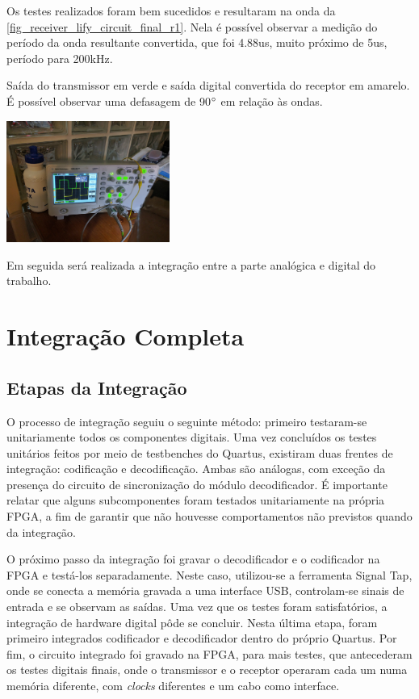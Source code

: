 	Os testes realizados foram bem sucedidos e resultaram na onda da \autoref{fig_receiver_lify_circuit_final_r1}. Nela é possível observar a medição do período da onda resultante convertida, que foi 4.88us, muito próximo de 5us, período para 200kHz.
	
	\begin{chart}[htb]
		\caption{\label{fig_receiver_lify_circuit_final_r1}Saída do transmissor em verde e saída digital convertida do receptor em amarelo. É possível observar uma defasagem de 90$\degree$ em relação às ondas.}
		\centering
		\includegraphics[width=0.4\textwidth, trim={36cm 30cm 60cm 40cm}, clip]{circuits/photos/TXRX_final_fixed.jpg}
	\end{chart}
	
	Em seguida será realizada a integração entre a parte analógica e digital do trabalho.

	\section{Integração Completa}
	
	\subsection{Etapas da Integração}
	O processo de integração seguiu o seguinte método: primeiro testaram-se unitariamente todos os componentes digitais. Uma vez concluídos os testes unitários feitos por meio de testbenches do Quartus, existiram duas frentes de integração: codificação e decodificação. Ambas são análogas, com exceção da presença do circuito de sincronização do módulo decodificador. É importante relatar que alguns subcomponentes foram testados unitariamente na própria FPGA, a fim de garantir que não houvesse comportamentos não previstos quando da integração. 
	
	O próximo passo da integração foi gravar o decodificador e o codificador na FPGA e testá-los separadamente. Neste caso, utilizou-se a ferramenta Signal Tap, onde se conecta a memória gravada a uma interface USB, controlam-se sinais de entrada e se observam as saídas. Uma vez que os testes foram satisfatórios, a integração de hardware digital pôde se concluir. Nesta última etapa, foram primeiro integrados codificador e decodificador dentro do próprio Quartus. Por fim, o circuito integrado foi gravado na FPGA, para mais testes, que antecederam os testes digitais finais, onde o transmissor e o receptor operaram cada um numa memória diferente, com \textit{clocks} diferentes e um cabo como interface.
	
